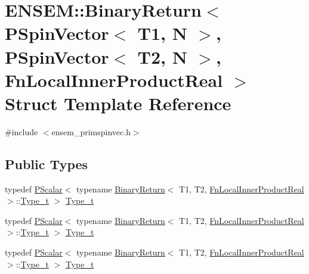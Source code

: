 \hypertarget{structENSEM_1_1BinaryReturn_3_01PSpinVector_3_01T1_00_01N_01_4_00_01PSpinVector_3_01T2_00_01N_01af7fecc465148c326d536be8c96c14c3}{}\section{E\+N\+S\+EM\+:\+:Binary\+Return$<$ P\+Spin\+Vector$<$ T1, N $>$, P\+Spin\+Vector$<$ T2, N $>$, Fn\+Local\+Inner\+Product\+Real $>$ Struct Template Reference}
\label{structENSEM_1_1BinaryReturn_3_01PSpinVector_3_01T1_00_01N_01_4_00_01PSpinVector_3_01T2_00_01N_01af7fecc465148c326d536be8c96c14c3}


{\ttfamily \#include $<$ensem\+\_\+primspinvec.\+h$>$}

\subsection*{Public Types}
\begin{DoxyCompactItemize}
\item 
typedef \mbox{\hyperlink{classENSEM_1_1PScalar}{P\+Scalar}}$<$ typename \mbox{\hyperlink{structENSEM_1_1BinaryReturn}{Binary\+Return}}$<$ T1, T2, \mbox{\hyperlink{structENSEM_1_1FnLocalInnerProductReal}{Fn\+Local\+Inner\+Product\+Real}} $>$\+::\mbox{\hyperlink{structENSEM_1_1BinaryReturn_3_01PSpinVector_3_01T1_00_01N_01_4_00_01PSpinVector_3_01T2_00_01N_01af7fecc465148c326d536be8c96c14c3_a28528ebdefaac463e65389dc8cc522a7}{Type\+\_\+t}} $>$ \mbox{\hyperlink{structENSEM_1_1BinaryReturn_3_01PSpinVector_3_01T1_00_01N_01_4_00_01PSpinVector_3_01T2_00_01N_01af7fecc465148c326d536be8c96c14c3_a28528ebdefaac463e65389dc8cc522a7}{Type\+\_\+t}}
\item 
typedef \mbox{\hyperlink{classENSEM_1_1PScalar}{P\+Scalar}}$<$ typename \mbox{\hyperlink{structENSEM_1_1BinaryReturn}{Binary\+Return}}$<$ T1, T2, \mbox{\hyperlink{structENSEM_1_1FnLocalInnerProductReal}{Fn\+Local\+Inner\+Product\+Real}} $>$\+::\mbox{\hyperlink{structENSEM_1_1BinaryReturn_3_01PSpinVector_3_01T1_00_01N_01_4_00_01PSpinVector_3_01T2_00_01N_01af7fecc465148c326d536be8c96c14c3_a28528ebdefaac463e65389dc8cc522a7}{Type\+\_\+t}} $>$ \mbox{\hyperlink{structENSEM_1_1BinaryReturn_3_01PSpinVector_3_01T1_00_01N_01_4_00_01PSpinVector_3_01T2_00_01N_01af7fecc465148c326d536be8c96c14c3_a28528ebdefaac463e65389dc8cc522a7}{Type\+\_\+t}}
\item 
typedef \mbox{\hyperlink{classENSEM_1_1PScalar}{P\+Scalar}}$<$ typename \mbox{\hyperlink{structENSEM_1_1BinaryReturn}{Binary\+Return}}$<$ T1, T2, \mbox{\hyperlink{structENSEM_1_1FnLocalInnerProductReal}{Fn\+Local\+Inner\+Product\+Real}} $>$\+::\mbox{\hyperlink{structENSEM_1_1BinaryReturn_3_01PSpinVector_3_01T1_00_01N_01_4_00_01PSpinVector_3_01T2_00_01N_01af7fecc465148c326d536be8c96c14c3_a28528ebdefaac463e65389dc8cc522a7}{Type\+\_\+t}} $>$ \mbox{\hyperlink{structENSEM_1_1BinaryReturn_3_01PSpinVector_3_01T1_00_01N_01_4_00_01PSpinVector_3_01T2_00_01N_01af7fecc465148c326d536be8c96c14c3_a28528ebdefaac463e65389dc8cc522a7}{Type\+\_\+t}}
\end{DoxyCompactItemize}


